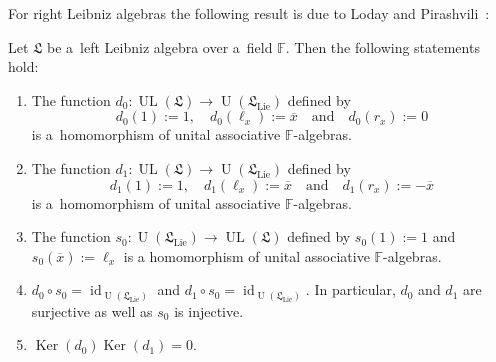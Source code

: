 \documentclass{jonasart}
\DeclareMathOperator{\id}{id}
\DeclareMathOperator{\Ker}{Ker}
\DeclareMathOperator{\lie}{Lie}
\DeclareMathOperator{\U}{U}
\DeclareMathOperator{\UL}{UL}
\newcommand{\fbb}{\mathbb{F}}
\newcommand{\lf}{\mathfrak{L}}
\begin{document}
	For right Leibniz algebras the following result is due to Loday and
	Pirashvili~\cite[Proposition 2.5]{LP1}:
	\begin{proposition}\label{augmented}
		Let $\lf$ be a~left Leibniz algebra over a~field $\fbb$. Then the following statements hold:
		\begin{enumerate}
			\item[\textrm{(a)}] The function $d_0:\UL(\lf)\to\U(\lf_{\lie})$ defined by
			\[
                d_0 (1):=1, \quad
                d_0 (\ell_x ):=\overline{x} \quad \text{and} \quad
                d_0 (r_x ):=0
            \]
            is a~homomorphism of unital associative $\fbb$-algebras.

			\item[\textrm{(b)}] The function $d_1:\UL(\lf)\to\U(\lf_{\lie})$ defined by
			\[
                d_1 (1):=1, \quad
                d_1 (\ell_x ):=\overline{x} \quad \text{and} \quad
                d_1 (r_x ):=-\overline{x}
            \]
            is a~homomorphism of unital associative $\fbb$-algebras.

			\item[\textrm{(c)}] The function $s_0:\U(\lf_{\lie})\to\UL(\lf)$ defined by
			$s_0 (1):=1$ and $s_0 (\overline{x}):=\ell_x$ is a homomorphism of unital associative $\fbb$-algebras.
			\item[\textrm{(d)}] $d_0\circ s_0 =\id_{\U(\lf_{\lie})}$ and $d_1\circ s_0
			=\id_{\U(\lf_{\lie})}$. In particular, $d_0$ and $d_1$
			are surjective as well as $s_0$ is injective.
			\item[\textrm{(e)}] $\Ker(d_0 )\Ker(d_1 )=0$.
		\end{enumerate}
	\end{proposition}
\end{document}
